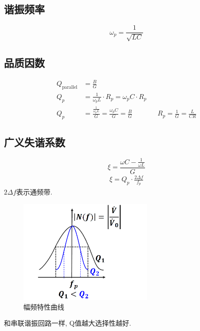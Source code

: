 \documentclass[a4paper]{report}
\begin{document}
\subsection{谐振频率}
$$\omega_p=\frac{1}{\sqrt{LC}}$$
\subsection{品质因数}
\begin{align*}
  Q_\text{parallel}&=\frac{B}{G}\\
  Q_p&=\frac{1}{\omega_p L}\cdot R_p=\omega_p C\cdot R_p\\
  Q_p&=\frac{\frac{1}{\omega_p L}}{G}=\frac{\omega_p C}{G}=\frac{B}{G}&& R_p=\frac{1}{G}=\frac{L}{CR}
\end{align*}
\subsection{广义失谐系数}
$$\xi=\frac{\omega C-\frac{1}{\omega L}}{G}$$
\begin{align*}
  \xi=Q_p\cdot\frac{2\Delta f}{f_p}
\end{align*}
$2\Delta f$表示通频带. 
\begin{figure}[H]
  \centering
  \includegraphics[width=0.6\textwidth]{p_r_graph.png}
  \caption{幅频特性曲线}
  \end{figure}
和串联谐振回路一样, Q值越大选择性越好. 
\end{document}
